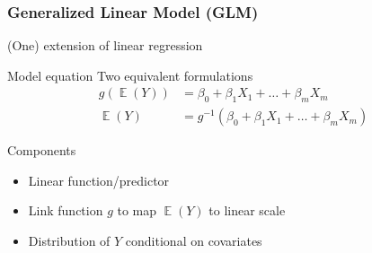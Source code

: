 \documentclass[
    utf8,
    aspectratio=169
]{beamer}  %
\DeclareMathOperator{\E}{\mathbb{E}}  %
\begin{document}
\begin{frame}
	\frametitle{Generalized Linear Model (GLM)}
	\begin{block}{(One) extension of linear regression}
	\end{block}
	
	\begin{block}{Model equation}
		Two equivalent formulations
		\begin{align*}
			g(\E(Y)) &= \beta_0 + \beta_1 X_1 + \dots + \beta_m X_m \\
			\E(Y) &= g^{-1}(\beta_0 + \beta_1 X_1 + \dots + \beta_m X_m)
		\end{align*}
	\end{block}
	
	\begin{block}{Components}
		\begin{itemize}
			\item Linear function/predictor
			\item Link function $g$ to map $\E(Y)$ to linear scale
			\item Distribution of $Y$ conditional on covariates
		\end{itemize}
	\end{block}
\end{frame}
\end{document}
